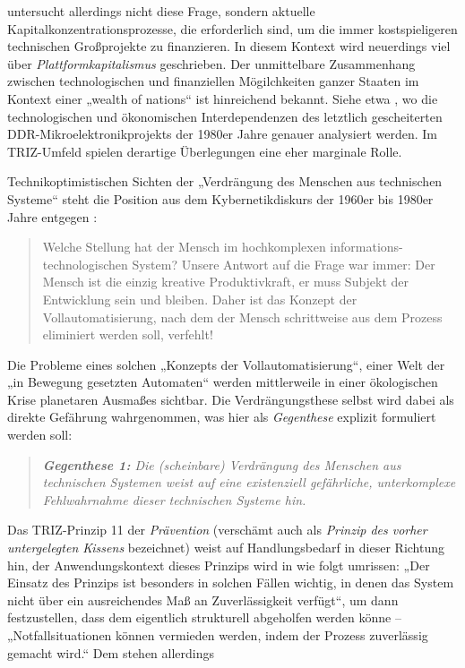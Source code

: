 \documentclass[11pt,a4paper]{article}
\begin{document}
\cite{Goldberg2016} untersucht allerdings nicht diese Frage, sondern aktuelle
Kapitalkonzentrationsprozesse, die erforderlich sind, um die immer
kostspieligeren technischen Großprojekte zu finanzieren.  In diesem Kontext
wird neuerdings viel über \emph{Plattformkapitalismus} geschrieben.  Der
unmittelbare Zusammenhang zwischen technologischen und finanziellen
Mögilchkeiten ganzer Staaten im Kontext einer „wealth of nations“ ist
hinreichend bekannt. Siehe etwa \cite{Barkleit2000}, wo die technologischen
und ökonomischen Interdependenzen des letztlich gescheiterten
DDR-Mikroelektronikprojekts der 1980er Jahre genauer analysiert werden. Im
TRIZ-Umfeld spielen derartige Überlegungen eine eher marginale Rolle.

Technikoptimistischen Sichten der „Verdrängung des Menschen aus technischen
Systeme“ steht die Position aus dem Kybernetikdiskurs der 1960er bis 1980er
Jahre entgegen \cite[S. 10]{KFK2000}:
\begin{quote}
  Welche Stellung hat der Mensch im hochkomplexen informations-technologischen
  System? Unsere Antwort auf die Frage war immer: Der Mensch ist die einzig
  kreative Produktivkraft, er muss Subjekt der Entwicklung sein und bleiben.
  Daher ist das Konzept der Vollautomatisierung, nach dem der Mensch
  schrittweise aus dem Prozess eliminiert werden soll, verfehlt!
\end{quote}
Die Probleme eines solchen „Konzepts der Vollautomatisierung“, einer Welt der
„in Bewegung gesetzten Automaten“ werden mittlerweile in einer ökologischen
Krise planetaren Ausmaßes sichtbar. Die Verdrängungsthese selbst wird dabei
als direkte Gefährung wahrgenommen, was hier als \emph{Gegenthese} explizit
formuliert werden soll:
\begin{quote}\it
  \textbf{Gegenthese 1:} Die (scheinbare) Verdrängung des Menschen aus
  technischen Systemen weist auf eine existenziell gefährliche, unterkomplexe
  Fehlwahrnahme dieser technischen Systeme hin.
\end{quote}
Das TRIZ-Prinzip 11 der \emph{Prävention} (verschämt auch als \emph{Prinzip
  des vorher untergelegten Kissens} bezeichnet) weist auf Handlungsbedarf in
dieser Richtung hin, der Anwendungskontext dieses Prinzips wird in \cite{TT}
wie folgt umrissen: „Der Einsatz des Prinzips ist besonders in solchen Fällen
wichtig, in denen das System nicht über ein ausreichendes Maß an
Zuverlässigkeit verfügt“, um dann festzustellen, dass dem eigentlich
strukturell abgeholfen werden könne -- „Notfallsituationen können vermieden
werden, indem der Prozess zuverlässig gemacht wird.“ Dem stehen allerdings
\end{document}
